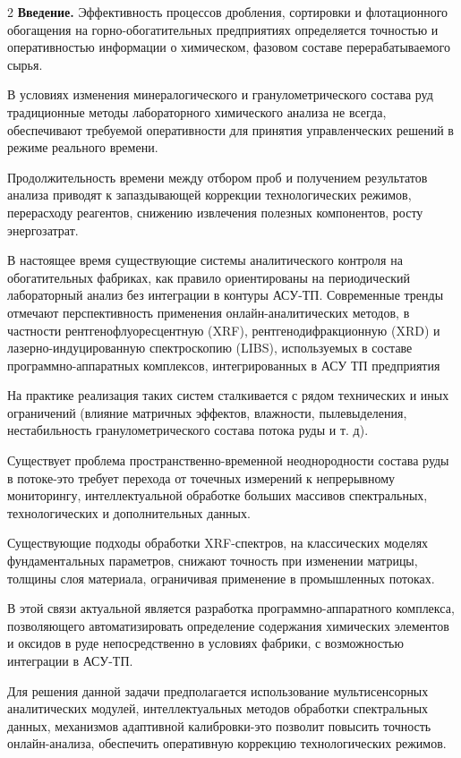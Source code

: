 \begin{multicols}{2}
{\bfseries Введение.} Эффективность процессов дробления, сортировки и
флотационного обогащения на горно-обогатительных предприятиях
определяется точностью и оперативностью информации о химическом, фазовом
составе перерабатываемого сырья.

В условиях изменения минералогического и гранулометрического состава руд
традиционные методы лабораторного химического анализа не всегда,
обеспечивают требуемой оперативности для принятия управленческих решений
в режиме реального времени.

Продолжительность времени между отбором проб и получением результатов
анализа приводят к запаздывающей коррекции технологических режимов,
перерасходу реагентов, снижению извлечения полезных компонентов, росту
энергозатрат.

В настоящее время существующие системы аналитического контроля на
обогатительных фабриках, как правило ориентированы на периодический
лабораторный анализ без интеграции в контуры АСУ-ТП. Современные тренды
отмечают перспективность применения онлайн-аналитических методов, в
частности рентгенофлуоресцентную (XRF), рентгенодифракционную (XRD) и
лазерно-индуцированную спектроскопию (LIBS), используемых в составе
программно-аппаратных комплексов, интегрированных в АСУ ТП предприятия

На практике реализация таких систем сталкивается с рядом технических и
иных ограничений (влияние матричных эффектов, влажности, пылевыделения,
нестабильность гранулометрического состава потока руды и т. д).

Существует проблема пространственно-временной неоднородности состава
руды в потоке-это требует перехода от точечных измерений к непрерывному
мониторингу, интеллектуальной обработке больших массивов спектральных,
технологических и дополнительных данных.

Существующие подходы обработки XRF-спектров, на классических моделях
фундаментальных параметров, снижают точность при изменении матрицы,
толщины слоя материала, ограничивая применение в промышленных потоках.

В этой связи актуальной является разработка программно-аппаратного
комплекса, позволяющего автоматизировать определение содержания
химических элементов и оксидов в руде непосредственно в условиях
фабрики, с возможностью интеграции в АСУ-ТП.

Для решения данной задачи предполагается использование мультисенсорных
аналитических модулей, интеллектуальных методов обработки спектральных
данных, механизмов адаптивной калибровки-это позволит повысить точность
онлайн-анализа, обеспечить оперативную коррекцию технологических
режимов.


\end{multicols}
